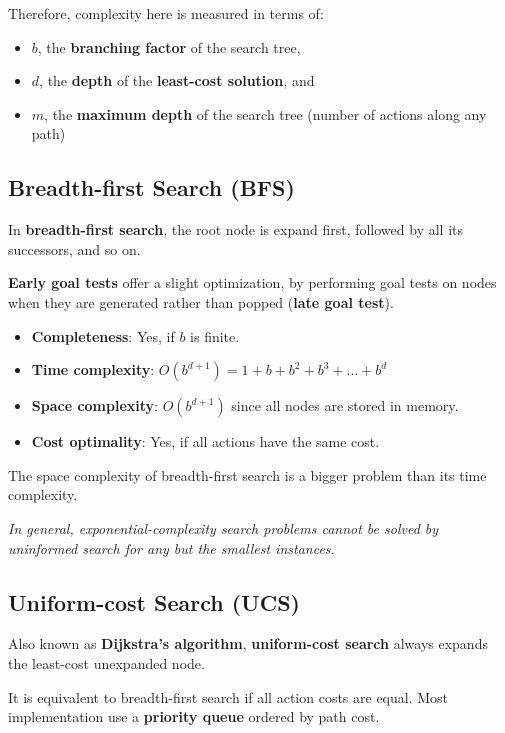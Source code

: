 Therefore, complexity here is measured in terms of:

\begin{itemize}
    \item $b$, the \textbf{branching factor} of the search tree,
    \item $d$, the \textbf{depth} of the \textbf{least-cost solution}, and
    \item $m$, the \textbf{maximum depth} of the search tree (number of actions along any path)
\end{itemize}


\subsection{Breadth-first Search (BFS)}

In \textbf{breadth-first search}, the root node is expand first, followed by all its successors, and so on.

\textbf{Early goal tests} offer a slight optimization, by performing goal tests on nodes when they are generated rather than popped (\textbf{late goal test}).

\begin{itemize}
    \item \textbf{Completeness}: Yes, if $b$ is finite.
    \item \textbf{Time complexity}: $O(b^{d+1}) = 1 + b + b^2 + b^3 + ... + b^d$
    \item \textbf{Space complexity}: $O(b^{d+1})$ since all nodes are stored in memory.
    \item \textbf{Cost optimality}: Yes, if all actions have the same cost.
\end{itemize}

The space complexity of breadth-first search is a bigger problem than its time complexity.

\emph{In general, exponential-complexity search problems cannot be solved by uninformed search for any but the smallest instances.}


\subsection{Uniform-cost Search (UCS)}

Also known as \textbf{Dijkstra's algorithm}, \textbf{uniform-cost search} always expands the least-cost unexpanded node.

It is equivalent to breadth-first search if all action costs are equal. Most implementation use a \textbf{priority queue} ordered by path cost.


